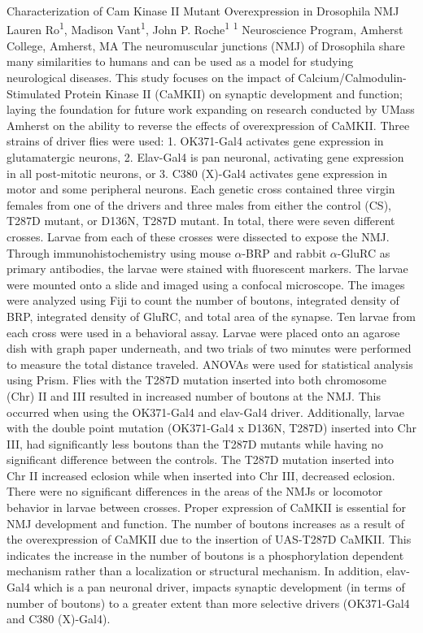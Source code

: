 \makeabstract
    {
    Characterization of Cam Kinase II Mutant Overexpression in Drosophila NMJ
    }
    {
    Lauren Ro\textsuperscript{1}, Madison Vant\textsuperscript{1}, John P. Roche\textsuperscript{1}
    }
    {
    \textsuperscript{1} Neuroscience Program, Amherst College, Amherst, MA
    }
    {
    The neuromuscular junctions (NMJ) of Drosophila share many similarities to humans and can be used as a model for studying neurological diseases. This study focuses on the impact of Calcium/Calmodulin-Stimulated Protein Kinase II (CaMKII) on synaptic development and function; laying the foundation for future work expanding on research conducted by UMass Amherst on the ability to reverse the effects of overexpression of CaMKII.
    }
    {
    Three strains of driver flies were used: 1. OK371-Gal4 activates gene expression in glutamatergic neurons, 2. Elav-Gal4 is pan neuronal, activating gene expression in all post-mitotic neurons, or 3. C380 (X)-Gal4 activates gene expression in motor and some peripheral neurons. Each genetic cross contained three virgin females from one of the drivers and three males from either the control (CS), T287D mutant, or D136N, T287D mutant. In total, there were seven different crosses. Larvae from each of these crosses were dissected to expose the NMJ. Through immunohistochemistry using mouse \ensuremath{\alpha}-BRP and rabbit \ensuremath{\alpha}-GluRC as primary antibodies, the larvae were stained with fluorescent markers. The larvae were mounted onto a slide and imaged using a confocal microscope. The images were analyzed using Fiji to count the number of boutons, integrated density of BRP, integrated density of GluRC, and total area of the synapse. Ten larvae from each cross were used in a behavioral assay. Larvae were placed onto an agarose dish with graph paper underneath, and two trials of two minutes were performed to measure the total distance traveled. ANOVAs were used for statistical analysis using Prism.
    }
    {
    Flies with the T287D mutation inserted into both chromosome (Chr) II and III resulted in increased number of boutons at the NMJ. This occurred when using the OK371-Gal4 and elav-Gal4 driver. Additionally, larvae with the double point mutation (OK371-Gal4 x D136N, T287D) inserted into Chr III, had significantly less boutons than the T287D mutants while having no significant difference between the controls. The T287D mutation inserted into Chr II increased eclosion while when inserted into Chr III, decreased eclosion. There were no significant differences in the areas of the NMJs or locomotor behavior in larvae between crosses.
    }
    {
    Proper expression of CaMKII is essential for NMJ development and function. The number of boutons increases as a result of the overexpression of CaMKII due to the insertion of UAS-T287D CaMKII. This indicates the increase in the number of boutons is a phosphorylation dependent mechanism rather than a localization or structural mechanism. In addition, elav-Gal4 which is a pan neuronal driver, impacts synaptic development (in terms of number of boutons) to a greater extent than more selective drivers (OK371-Gal4 and C380 (X)-Gal4).
    }

    \newpage
    